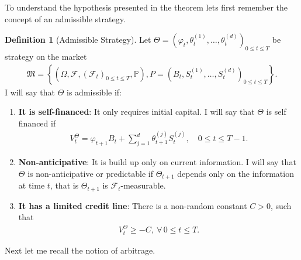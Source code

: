 \documentclass{article}
\theoremstyle{definition}
\newtheorem{definition}[theorem]{Definition}
\numberwithin{equation}{section}
\begin{document}
To understand the hypothesis presented in the theorem lets first remember the concept of an admissible strategy.
\begin{definition}[Admissible Strategy]
    Let $\Theta = \left(\varphi_t, \theta_t^{(1)}, \ldots, \theta_t^{(d)}\right)_{0 \leq t \leq T}$ be strategy on the market
    \begin{align}
        \mathfrak{M} =
        \left\{
            \left(
                \Omega, 
                \mathscr{F}, 
                \left(
                    \mathscr{F}_t
                \right)_{0 \leq t \leq T},
                \mathbb{P}
            \right),
            P =
            \left(
                B_t,
                S_t^{(1)},
                \ldots,
                S_t^{(d)}
            \right)_{0 \leq t \leq T}
        \right\}.
    \end{align}
    I will say that $\Theta$ is admissible if:
    \begin{enumerate}
        \item \textbf{It is self-financed}: It only requires initial capital.
        I will say that $\Theta$ is self financed if
        \begin{align}
            V_t^{\Theta} = \varphi_{t+1}B_t + \sum_{j=1}^d \theta_{t+1}^{(j)}S_t^{(j)}, \quad 0 \leq t \leq T-1. 
        \end{align}
        \item \textbf{Non-anticipative}: It is build up only on current information.
        I will say that $\Theta$ is non-anticipative or predictable if $\Theta_{t+1}$ depends only on the information at time $t$, that is $\Theta_{t+1}$ is $\mathscr{F}_t$-measurable.
        \item \textbf{It has a limited credit line}: There is a non-random constant $C > 0$, such that
        \begin{align}
            V_t^{\Theta} \geq -C, \ \forall \, 0 \leq t \leq T.
        \end{align}
    \end{enumerate}
\end{definition}
Next let me recall the notion of arbitrage.
\end{document}
